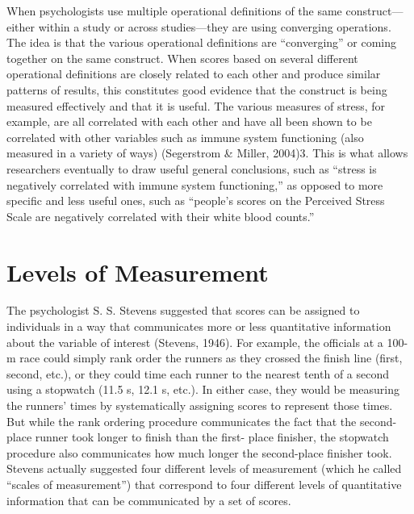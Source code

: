 \documentclass[]{book}
\theoremstyle{definition}
\theoremstyle{definition}
\theoremstyle{remark}
\begin{document}
When psychologists use multiple operational definitions of the same
construct---either within a study or across studies---they are using
converging operations. The idea is that the various operational
definitions are ``converging'' or coming together on the same construct.
When scores based on several different operational definitions are
closely related to each other and produce similar patterns of results,
this constitutes good evidence that the construct is being measured
effectively and that it is useful. The various measures of stress, for
example, are all correlated with each other and have all been shown to
be correlated with other variables such as immune system functioning
(also measured in a variety of ways) (Segerstrom \& Miller, 2004)3. This
is what allows researchers eventually to draw useful general
conclusions, such as ``stress is negatively correlated with immune
system functioning,'' as opposed to more specific and less useful ones,
such as ``people's scores on the Perceived Stress Scale are negatively
correlated with their white blood counts.''

\section{Levels of Measurement}\label{levels-of-measurement}

The psychologist S. S. Stevens suggested that scores can be assigned to
individuals in a way that communicates more or less quantitative
information about the variable of interest (Stevens, 1946). For example,
the officials at a 100-m race could simply rank order the runners as
they crossed the finish line (first, second, etc.), or they could time
each runner to the nearest tenth of a second using a stopwatch (11.5 s,
12.1 s, etc.). In either case, they would be measuring the runners'
times by systematically assigning scores to represent those times. But
while the rank ordering procedure communicates the fact that the
second-place runner took longer to finish than the first- place
finisher, the stopwatch procedure also communicates how much longer the
second-place finisher took. Stevens actually suggested four different
levels of measurement (which he called ``scales of measurement'') that
correspond to four different levels of quantitative information that can
be communicated by a set of scores.
\end{document}
